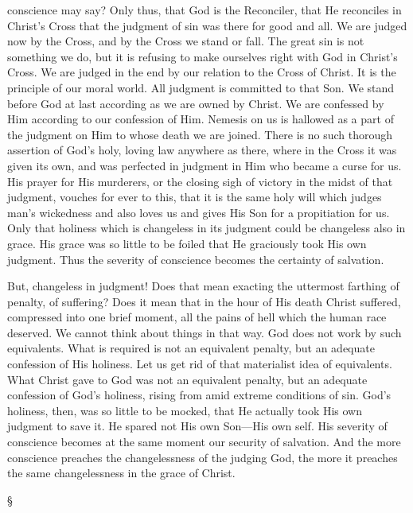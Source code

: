 \documentclass[12pt,letterpaper,oneside]{book}
\begin{document}
conscience may say? Only thus, that God is the 
Reconciler, that He reconciles in Christ's Cross 
that the judgment of sin was there for good and 
all. We are judged now by the Cross, and by 
the Cross we stand or fall. The great sin is not 
something we do, but it is refusing to make ourselves 
right with God in Christ's Cross. We are 
judged in the end by our relation to the Cross of 
Christ. It is the principle of our moral world. 
All judgment is committed to that Son. We 
stand before God at last according as we are 
owned by Christ. We are confessed by Him 
according to our confession of Him. Nemesis 
on us is hallowed as a part of the judgment 
on Him to whose death we are joined. There is 
no such thorough assertion of God's holy, loving 
law anywhere as there, where in the Cross it 
was given its own, and was perfected in judgment 
in Him who became a curse for us. His 
prayer for His murderers, or the closing sigh of 
victory in the midst of that judgment, vouches 
for ever to this, that it is the same holy will 
which judges man's wickedness and also loves us 
and gives His Son for a propitiation for us. 
Only that holiness which is changeless in its 
judgment could be changeless also in grace. 
His grace was so little to be foiled that He 
graciously took His own judgment. Thus the 
severity of conscience becomes the certainty of 
salvation. 


But, changeless in judgment! Does that mean 
exacting the uttermost farthing of penalty, of 
suffering? Does it mean that in the hour of 
His death Christ suffered, compressed into one 
brief moment, all the pains of hell which the 
human race deserved. We cannot think about 
things in that way. God does not work by such 
equivalents. What is required is not an equivalent 
penalty, but an adequate confession of His 
holiness. Let us get rid of that materialist 
idea of equivalents. What Christ gave to God 
was not an equivalent penalty, but an adequate 
confession of God's holiness, rising from amid 
extreme conditions of sin. God's holiness, then, 
was so little to be mocked, that He actually 
took His own judgment to save it. He spared 
not His own Son---His own self. His severity 
of conscience becomes at the same moment our 
security of salvation. And the more conscience 
preaches the changelessness of the judging God, 
the more it preaches the same changelessness in 
the grace of Christ. 

\begin{center}
\S
\end{center}
\end{document}
